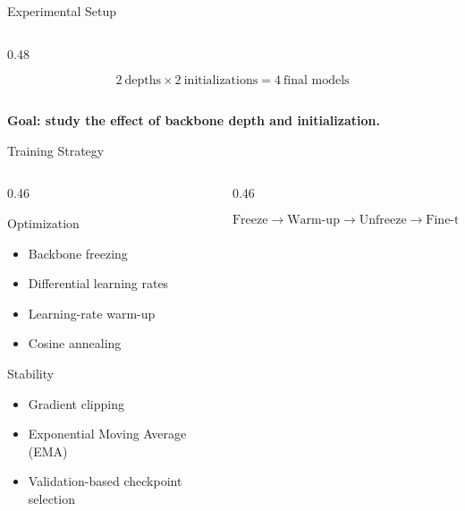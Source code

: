 \documentclass[aspectratio=169,11pt]{beamer}
\begin{document}
\begin{frame}{Experimental Setup}
\begin{columns}[t]
\begin{column}{0.48\textwidth}
\vspace{0.25cm}

\centering
\[
\boxed{
2\ \text{depths}
\times
2\ \text{initializations}
=
4\ \text{final models}
}
\]

\end{column}

\end{columns}

\vspace{0.3cm}



\centering
\textbf{Goal: study the effect of backbone depth and initialization.}

\end{frame}

\begin{frame}{Training Strategy}
\begin{columns}[t]

\begin{column}{0.46\textwidth}

\begin{block}{Optimization}
\small
\begin{itemize}
    \item Backbone freezing
    \item Differential learning rates
    \item Learning-rate warm-up
    \item Cosine annealing
\end{itemize}
\end{block}

\vspace{0.25cm}

\begin{block}{Stability}
\small
\begin{itemize}
    \item Gradient clipping
    \item Exponential Moving Average (EMA)
    \item Validation-based checkpoint selection
\end{itemize}
\end{block}

\end{column}

\begin{column}{0.46\textwidth}
\centering

\[
\text{Freeze}
\rightarrow
\text{Warm-up}
\rightarrow
\text{Unfreeze}
\rightarrow
\text{Fine-tune}
\]


\end{column}
\end{columns}
\end{frame}
\end{document}
